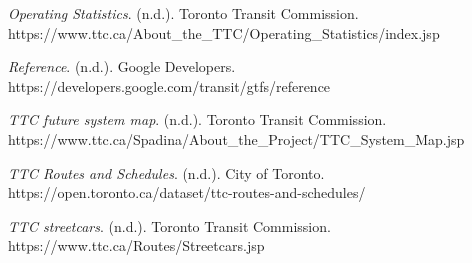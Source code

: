 \documentclass[fontsize=11pt]{article}
\begin{document}
    \hangindent=0.75in
    \textit{Operating Statistics}. (n.d.). Toronto Transit Commission. \\
    https://www.ttc.ca/About\_the\_TTC/Operating\_Statistics/index.jsp

    \hangindent=0.75in
    \textit{Reference}. (n.d.). Google Developers. https://developers.google.com/transit/gtfs/reference

    \hangindent=0.75in
    \textit{TTC future system map}. (n.d.). Toronto Transit Commission. \\
    https://www.ttc.ca/Spadina/About\_the\_Project/TTC\_System\_Map.jsp

    \hangindent=0.75in
    \textit{TTC Routes and Schedules}. (n.d.). City of Toronto. \\
    https://open.toronto.ca/dataset/ttc-routes-and-schedules/

    \hangindent=0.75in
    \textit{TTC streetcars}. (n.d.). Toronto Transit Commission. https://www.ttc.ca/Routes/Streetcars.jsp


\end{document}

